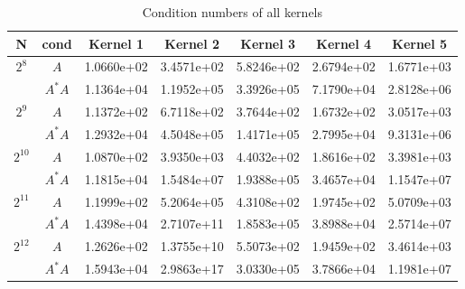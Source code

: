 \documentclass[11pt]{article}
\begin{document}
\begin{table}[!htbp]
\centering
\begin{tabular}{|c|c|c|c|c|c|c|}
\hline
N & cond &Kernel 1 & Kernel 2 & Kernel 3 & Kernel 4 & Kernel 5 \\ 
\hline
$2^{8}$ & $A$ & 1.0660e+02 & 3.4571e+02 & 5.8246e+02 & 2.6794e+02 & 1.6771e+03\\
~ & $A^{*}A$ & 1.1364e+04 & 1.1952e+05 & 3.3926e+05 & 7.1790e+04 & 2.8128e+06\\
\hline
$2^{9}$ & $A$ & 1.1372e+02 & 6.7118e+02 & 3.7644e+02 & 1.6732e+02 & 3.0517e+03\\
~ & $A^{*}A$ & 1.2932e+04 & 4.5048e+05 & 1.4171e+05 & 2.7995e+04 & 9.3131e+06\\
\hline
$2^{10}$ & $A$ & 1.0870e+02 & 3.9350e+03 & 4.4032e+02 & 1.8616e+02 & 3.3981e+03\\
~ & $A^{*}A$ & 1.1815e+04 & 1.5484e+07 & 1.9388e+05 & 3.4657e+04 & 1.1547e+07\\
\hline
$2^{11}$ & $A$ & 1.1999e+02 & 5.2064e+05 & 4.3108e+02 & 1.9745e+02 & 5.0709e+03\\
~ & $A^{*}A$ & 1.4398e+04 & 2.7107e+11 & 1.8583e+05 & 3.8988e+04 & 2.5714e+07\\
\hline
$2^{12}$ & $A$ & 1.2626e+02 & 1.3755e+10 & 5.5073e+02 & 1.9459e+02 & 3.4614e+03\\
~ & $A^{*}A$ & 1.5943e+04 & 2.9863e+17 & 3.0330e+05 & 3.7866e+04 & 1.1981e+07\\



\end{tabular}

\caption{Condition numbers of all kernels}
\label{cond}
\end{table}
\end{document}
